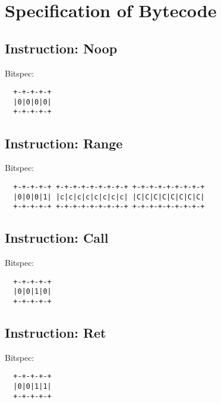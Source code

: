 \section{Specification of Bytecode}

\subsection{Instruction: Noop}

Bitspec:

\begin{myquote}
\begin{verbatim}
  +-+-+-+-+
  |0|0|0|0|
  +-+-+-+-+
\end{verbatim}
\end{myquote}
  
\subsection{Instruction: Range}

Bitspec:

\begin{myquote}
\begin{verbatim}
  +-+-+-+-+ +-+-+-+-+-+-+-+-+ +-+-+-+-+-+-+-+-+
  |0|0|0|1| |c|c|c|c|c|c|c|c| |C|C|C|C|C|C|C|C|
  +-+-+-+-+ +-+-+-+-+-+-+-+-+ +-+-+-+-+-+-+-+-+
\end{verbatim}
\end{myquote}
  
\subsection{Instruction: Call}

Bitspec:

\begin{myquote}
\begin{verbatim}
  +-+-+-+-+
  |0|0|1|0|
  +-+-+-+-+
\end{verbatim}
\end{myquote}
  
\subsection{Instruction: Ret}

Bitspec:

\begin{myquote}
\begin{verbatim}
  +-+-+-+-+
  |0|0|1|1|
  +-+-+-+-+
\end{verbatim}
\end{myquote}
  
